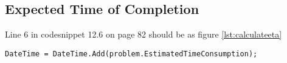 \subsection*{Expected Time of Completion}
Line 6 in codesnippet 12.6 on page 82 should be as figure \ref{lst:calculateeta}

\begin{lstlisting}[style=sourceCode, caption=\myCaption{The corrected code snippet}, label=lst:calculateeta,float=h]
DateTime = DateTime.Add(problem.EstimatedTimeConsumption);
     
\end{lstlisting}
